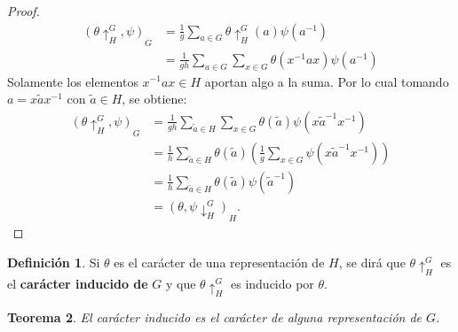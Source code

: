\documentclass[12pt]{book}
\newtheorem{theorem}{Teorema}[section]
\theoremstyle{definition}
\newtheorem{definition}[theorem]{Definición}
\newcounter{in}
\newcounter{ini}
\begin{document}
\begin{proof}
  \begin{equation}
    \label{eq:59}
    \begin{aligned}
      (\theta\uparrow^{G}_{H},\psi)_{G} &= \frac{1}{g} \sum_{a \in G} \theta\uparrow^{G}_{H} (a) \psi(a^{-1})\\
      &= \frac{1}{gh} \sum_{a \in G} \sum_{x \in G} \theta(x^{-1}ax) \psi(a^{-1})
    \end{aligned}
  \end{equation}  
  Solamente los elementos $x^{-1}ax \in H$ aportan algo a la suma. Por
  lo cual tomando $a=x \tilde{a} x^{-1}$ con $\tilde{a} \in H$, se
  obtiene:
  \begin{equation}
    \label{eq:60}
    \begin{aligned}
      (\theta\uparrow^{G}_{H},\psi)_{G} &= \frac{1}{gh} \sum_{\tilde{a} \in H} \sum_{x \in G} \theta(\tilde{a}) \psi(x \tilde{a}^{-1} x^{-1})\\
      &= \frac{1}{h} \sum_{\tilde{a} \in H} \theta (\tilde{a}) (\frac{1}{g}\sum_{x \in G} \psi(x \tilde{a}^{-1}x^{-1})) \\
      &= \frac{1}{h} \sum_{\tilde{a} \in H} \theta (\tilde{a}) \psi(\tilde{a}^{-1}) \\
      &=  (\theta,\psi\downarrow^{G}_{H})_{H}.
    \end{aligned}
  \end{equation}
\end{proof}
\begin{definition}
Si $\theta$ es el carácter de una representación de $H$, se dirá que
$\theta\uparrow^{G}_{H}$ es el \textbf{carácter inducido de} $G$ y que
$\theta\uparrow^{G}_{H}$ es inducido por $\theta$. 
\end{definition}
\begin{theorem}
\label{ind_carc_t}
El carácter inducido es el carácter de alguna
representación de $G$.
\end{theorem}
\end{document}
